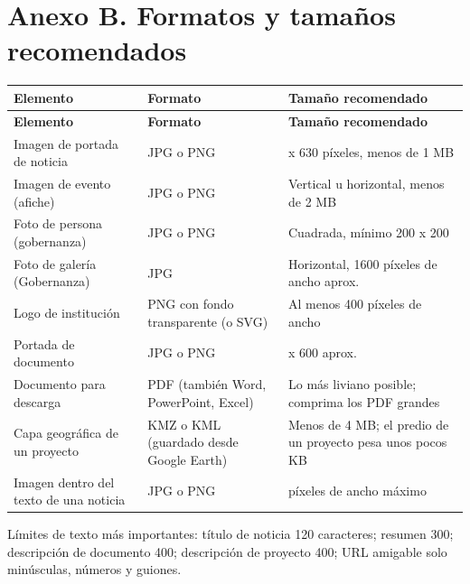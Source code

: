 \documentclass[11pt,letterpaper]{report}
\begin{document}
\section{Anexo B. Formatos y tamaños recomendados}
\begin{longtable}{>{\raggedright\arraybackslash}p{}>{\raggedright\arraybackslash}p{}>{\raggedright\arraybackslash}p{}}
\rowcolor{h2vazul}\textbf{\color{white}Elemento} & \textbf{\color{white}Formato} & \textbf{\color{white}Tamaño recomendado} \\
\endfirsthead
\rowcolor{h2vazul}\textbf{\color{white}Elemento} & \textbf{\color{white}Formato} & \textbf{\color{white}Tamaño recomendado} \\
\endhead
Imagen de portada de noticia & JPG o PNG & 1200 x 630 píxeles, menos de 1 MB \\ \midrule
\rowcolor{filaalt}Imagen de evento (afiche) & JPG o PNG & Vertical u horizontal, menos de 2 MB \\ \midrule
Foto de persona (gobernanza) & JPG o PNG & Cuadrada, mínimo 200 x 200 \\ \midrule
\rowcolor{filaalt}Foto de galería (Gobernanza) & JPG & Horizontal, 1600 píxeles de ancho aprox. \\ \midrule
Logo de institución & PNG con fondo transparente (o SVG) & Al menos 400 píxeles de ancho \\ \midrule
\rowcolor{filaalt}Portada de documento & JPG o PNG & 800 x 600 aprox. \\ \midrule
Documento para descarga & PDF (también Word, PowerPoint, Excel) & Lo más liviano posible; comprima los PDF grandes \\ \midrule
\rowcolor{filaalt}Capa geográfica de un proyecto & KMZ o KML (guardado desde Google Earth) & Menos de 4 MB; el predio de un proyecto pesa unos pocos KB \\ \midrule
Imagen dentro del texto de una noticia & JPG o PNG & 1200 píxeles de ancho máximo \\ \bottomrule
\end{longtable}
Límites de texto más importantes: título de noticia 120 caracteres; resumen 300; descripción de documento 400; descripción de proyecto 400; URL amigable solo minúsculas, números y guiones.
\end{document}
